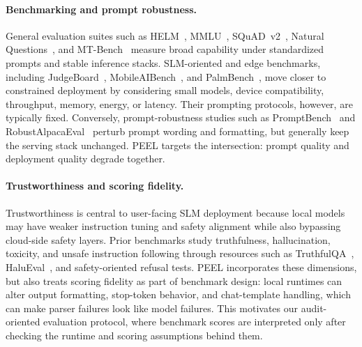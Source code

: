 \documentclass[letterpaper]{article} %
\begin{document}
\paragraph{Benchmarking and prompt robustness.}
General evaluation suites such as HELM~\cite{helm2022}, MMLU~\cite{mmlu2021}, SQuAD~v2~\cite{squad2}, Natural Questions~\cite{nqopen}, and MT-Bench~\cite{mtbench2023} measure broad capability under standardized prompts and stable inference stacks. SLM-oriented and edge benchmarks, including JudgeBoard~\cite{smlbenchmark}, MobileAIBench~\cite{Mobileaibench}, and PalmBench~\cite{li2025palmbench}, move closer to constrained deployment by considering small models, device compatibility, throughput, memory, energy, or latency. Their prompting protocols, however, are typically fixed. Conversely, prompt-robustness studies such as PromptBench~\cite{zhu2023promptrobust} and RobustAlpacaEval~\cite{ralpaca2024} perturb prompt wording and formatting, but generally keep the serving stack unchanged. PEEL targets the intersection: prompt quality and deployment quality degrade together.

\paragraph{Trustworthiness and scoring fidelity.}
Trustworthiness is central to user-facing SLM deployment because local models may have weaker instruction tuning and safety alignment while also bypassing cloud-side safety layers. Prior benchmarks study truthfulness, hallucination, toxicity, and unsafe instruction following through resources such as TruthfulQA~\cite{truthfulqa}, HaluEval~\cite{halueval2023}, and safety-oriented refusal tests. PEEL incorporates these dimensions, but also treats scoring fidelity as part of benchmark design: local runtimes can alter output formatting, stop-token behavior, and chat-template handling, which can make parser failures look like model failures. This motivates our audit-oriented evaluation protocol, where benchmark scores are interpreted only after checking the runtime and scoring assumptions behind them.


\end{document}
